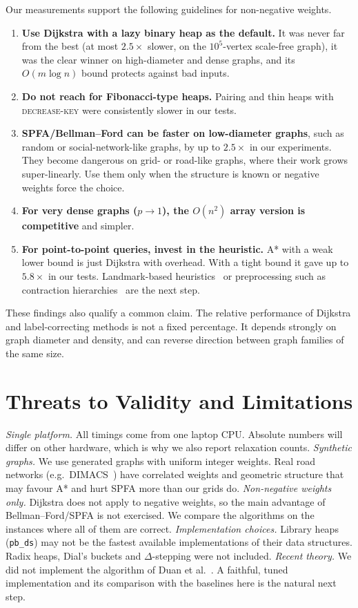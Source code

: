 \documentclass[conference]{IEEEtran}
\begin{document}
Our measurements support the following guidelines for non-negative weights.
\begin{enumerate}
  \item \textbf{Use Dijkstra with a lazy binary heap as the default.} It was
        never far from the best (at most $2.5\times$ slower, on the
        $10^5$-vertex scale-free graph), it was the clear winner on high-diameter and dense
        graphs, and its $O(m\log n)$ bound protects against bad inputs.
  \item \textbf{Do not reach for Fibonacci-type heaps.} Pairing and thin heaps
        with \textsc{decrease-key} were consistently slower in our tests.
  \item \textbf{SPFA/Bellman--Ford can be faster on low-diameter graphs}, such
        as random or social-network-like graphs, by up to $2.5\times$ in our
        experiments. They become dangerous on grid- or road-like graphs, where
        their work grows super-linearly. Use them only when the structure is
        known or negative weights force the choice.
  \item \textbf{For very dense graphs ($p\to1$), the $O(n^2)$ array version is
        competitive} and simpler.
  \item \textbf{For point-to-point queries, invest in the heuristic.} A* with a
        weak lower bound is just Dijkstra with overhead. With a tight bound it
        gave up to $5.8\times$ in our tests. Landmark-based
        heuristics~\cite{goldberg2005} or preprocessing such as contraction
        hierarchies~\cite{geisberger2008} are the next step.
\end{enumerate}
These findings also qualify a common claim. The relative performance of
Dijkstra and label-correcting methods is not a fixed percentage. It depends
strongly on graph diameter and density, and can reverse direction between
graph families of the same size.

\section{Threats to Validity and Limitations}
\label{sec:limits}

\emph{Single platform.} All timings come from one laptop CPU. Absolute numbers
will differ on other hardware, which is why we also report relaxation counts.
\emph{Synthetic graphs.} We use generated graphs with uniform integer weights.
Real road networks (e.g.\ DIMACS~\cite{dimacs2009}) have correlated weights and
geometric structure that may favour A* and hurt SPFA more than our grids do.
\emph{Non-negative weights only.} Dijkstra does not apply to negative weights,
so the main advantage of Bellman--Ford/SPFA is not exercised. We compare the
algorithms on the instances where all of them are correct.
\emph{Implementation choices.} Library heaps (\texttt{pb\_ds}) may not be the
fastest available implementations of their data structures. Radix heaps, Dial's
buckets and $\Delta$-stepping were not included.
\emph{Recent theory.} We did not implement the algorithm of
Duan et al.~\cite{duan2025}. A faithful, tuned implementation and its comparison
with the baselines here is the natural next step.
\end{document}
